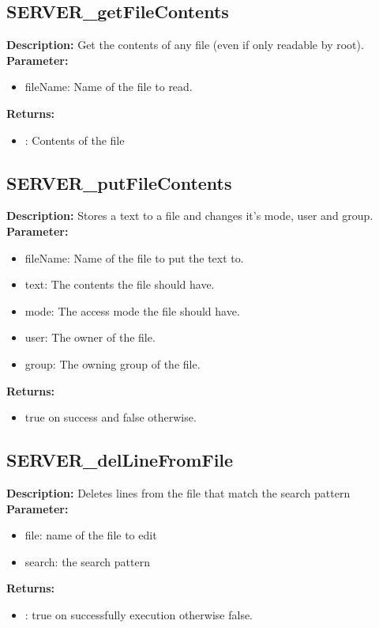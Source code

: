 \subsection{SERVER\_getFileContents}
\textbf{Description:} Get the contents of any file (even if only readable by root).\\
\textbf{Parameter:}
\begin{itemize}
\item fileName: Name of the file to read.
\end{itemize}
\textbf{Returns:}
\begin{itemize}
\item : Contents of the file
\end{itemize}

\subsection{SERVER\_putFileContents}
\textbf{Description:} Stores a text to a file and changes it's mode, user and group.\\
\textbf{Parameter:}
\begin{itemize}
\item fileName: Name of the file to put the text to.
\item text: The contents the file should have.
\item mode: The access mode the file should have.
\item user: The owner of the file.
\item group: The owning group of the file.
\end{itemize}
\textbf{Returns:}
\begin{itemize}
\item true on success and false otherwise.
\end{itemize}

\subsection{SERVER\_delLineFromFile}
\textbf{Description:} Deletes lines from the file that match the search pattern\\
\textbf{Parameter:}
\begin{itemize}
\item file: name of the file to edit
\item search: the search pattern
\end{itemize}
\textbf{Returns:}
\begin{itemize}
\item : true on successfully execution otherwise false.
\end{itemize}

